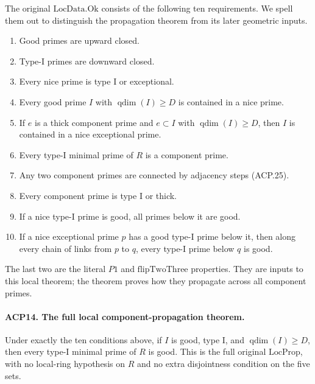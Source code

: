 The original \(\mathrm{LocData.Ok}\) consists of the following
ten requirements.  We spell them out to distinguish the
propagation theorem from its later geometric inputs.
\begin{enumerate}
\item Good primes are upward closed.
\item Type-I primes are downward closed.
\item Every nice prime is type I or exceptional.
\item Every good prime \(I\) with \(\operatorname{qdim}(I)\ge D\)
      is contained in a nice prime.
\item If \(e\) is a thick component prime and
      \(e\subset I\) with \(\operatorname{qdim}(I)\ge D\),
      then \(I\) is contained in a nice exceptional prime.
\item Every type-I minimal prime of \(R\) is a component prime.
\item Any two component primes are connected by adjacency steps
      (ACP.25).
\item Every component prime is type I or thick.
\item If a nice type-I prime is good, all primes below it are good.
\item If a nice exceptional prime \(p\) has a good type-I prime
      below it, then along every chain of links from \(p\) to
      \(q\), every type-I prime below \(q\) is good.
\end{enumerate}
The last two are the literal \(P1\) and
\(\mathrm{flipTwoThree}\) properties.  They are inputs to
this local theorem; the theorem proves how they propagate across
all component primes.

\paragraph{ACP14. The full local component-propagation theorem.}
\label{claim:ACP14}
Under exactly the ten conditions above, if \(I\) is good,
type I, and \(\operatorname{qdim}(I)\ge D\), then every
type-I minimal prime of \(R\) is good.  This is the full
original \(\mathrm{LocProp}\), with no local-ring hypothesis
on \(R\) and no extra disjointness condition on the five sets.

